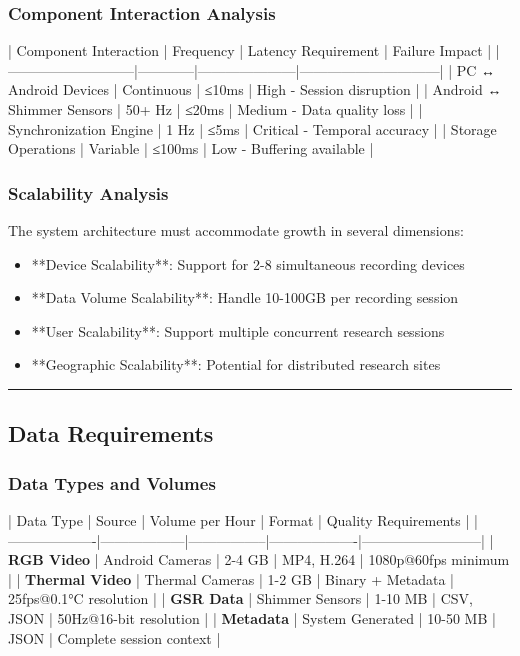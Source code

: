 \documentclass[11pt,a4paper]{report}
\begin{document}
\subsubsection{Component Interaction Analysis}

| Component Interaction     | Frequency  | Latency Requirement | Failure Impact               |
|---------------------------|------------|---------------------|------------------------------|
| PC ↔ Android Devices      | Continuous | ≤10ms               | High - Session disruption    |
| Android ↔ Shimmer Sensors | 50+ Hz     | ≤20ms               | Medium - Data quality loss   |
| Synchronization Engine    | 1 Hz       | ≤5ms                | Critical - Temporal accuracy |
| Storage Operations        | Variable   | ≤100ms              | Low - Buffering available    |

\subsubsection{Scalability Analysis}

The system architecture must accommodate growth in several dimensions:

\begin{itemize}
\item **Device Scalability**: Support for 2-8 simultaneous recording devices
\item **Data Volume Scalability**: Handle 10-100GB per recording session
\item **User Scalability**: Support multiple concurrent research sessions
\item **Geographic Scalability**: Potential for distributed research sites

\end{itemize}
\hrule

\subsection{Data Requirements}

\subsubsection{Data Types and Volumes}

| Data Type         | Source           | Volume per Hour | Format            | Quality Requirements     |
|-------------------|------------------|-----------------|-------------------|--------------------------|
| \textbf{RGB Video}     | Android Cameras  | 2-4 GB          | MP4, H.264        | 1080p@60fps minimum      |
| \textbf{Thermal Video} | Thermal Cameras  | 1-2 GB          | Binary + Metadata | 25fps@0.1°C resolution   |
| \textbf{GSR Data}      | Shimmer Sensors  | 1-10 MB         | CSV, JSON         | 50Hz@16-bit resolution   |
| \textbf{Metadata}      | System Generated | 10-50 MB        | JSON              | Complete session context |
\end{document}
